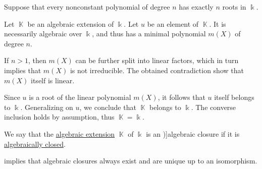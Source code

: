\begin{defproof}
   Suppose that every nonconstant polynomial of degree \( n \) has exactly \( n \) roots in \( \Bbbk \).

  Let \( \BbbK \) be an algebraic extension of \( \Bbbk \). Let \( u \) be an element of \( \BbbK \). It is necessarily algebraic over \( \Bbbk \), and thus has a minimal polynomial \( m(X) \) of degree \( n \).

  If \( n > 1 \), then \( m(X) \) can be further split into linear factors, which in turn implies that \( m(X) \) is not irreducible. The obtained contradiction show that \( m(X) \) itself is linear.

  Since \( u \) is a root of the linear polynomial \( m(X) \), it follows that \( u \) itself belongs to \( \Bbbk \). Generalizing on \( u \), we conclude that \( \BbbK \) belongs to \( \Bbbk \). The converse inclusion holds by assumption, thus \( \BbbK = \Bbbk \).
\end{defproof}

\begin{definition}\label{def:algebraic_closure}
  We say that the \hyperref[def:algebraic_extension]{algebraic extension} \( \BbbK \) of \( \Bbbk \) is an \term[ru=алгебраическое замыкание (\cite[412]{Винберг2014})]{algebraic closure} if it is \hyperref[def:algebraically_closed_field]{algebraically closed}.
\end{definition}
\begin{comments}
  \item {} implies that algebraic closures always exist and are unique up to an isomorphism.
\end{comments}

